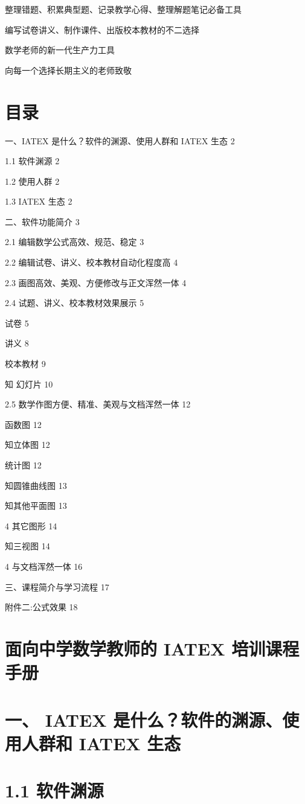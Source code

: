 \documentclass[10pt]{article}
\begin{document}
整理错题、积累典型题、记录教学心得、整理解题笔记必备工具

编写试卷讲义、制作课件、出版校本教材的不二选择

数学老师的新一代生产力工具

向每一个选择长期主义的老师致敬

\section*{目录}

一、IATEX 是什么？软件的渊源、使用人群和 IATEX 生态 2

1.1 软件渊源 2

1.2 使用人群 2

1.3 IATEX 生态 2

二、软件功能简介 3

2.1 编辑数学公式高效、规范、稳定 3

2.2 编辑试卷、讲义、校本教材自动化程度高 4

2.3 画图高效、美观、方便修改与正文浑然一体 4

2.4 试题、讲义、校本教材效果展示 5

试卷 5

讲义 8

校本教材 9

知 幻灯片 10

2.5 数学作图方便、精准、美观与文档浑然一体 12

函数图 12

知立体图 12

统计图 12

知圆锥曲线图 13

知其他平面图 13

4 其它图形 14

知三视图 14

4 与文档浑然一体 16

三、课程简介与学习流程 17

附件二:公式效果 18

\section*{面向中学数学教师的 IATEX 培训课程手册}

\section*{一、 IATEX 是什么？软件的渊源、使用人群和 IATEX 生态}

\section*{1.1 软件渊源}
\end{document}

